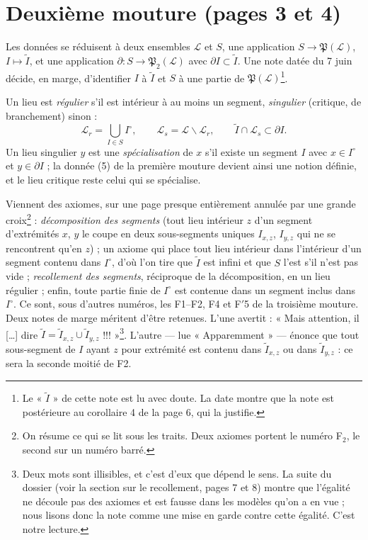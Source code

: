 \documentclass[11pt,a4paper]{article}
\begin{document}
\section*{Deuxième mouture (pages 3 et 4)}

Les données se réduisent à deux ensembles $\mathcal{L}$ et $S$, une
application $S \to \mathfrak{P}(\mathcal{L})$, $I \mapsto \widetilde{I}$, et
une application $\partial : S \to \mathfrak{P}_{2}(\mathcal{L})$ avec
$\partial I \subset \widetilde{I}$. Une note datée du 7 juin décide, en
marge, d'identifier $I$ à $\widetilde{I}$ et $S$ à une partie de
$\mathfrak{P}(\mathcal{L})$\footnote{Le « $\widetilde{I}$ » de cette note est
lu avec doute. La date montre que la note est postérieure au corollaire 4 de
la page 6, qui la justifie.}.

Un lieu est \emph{régulier} s'il est intérieur à au moins un segment,
\emph{singulier} (critique, de branchement) sinon :
\[
\mathcal{L}_{r} = \bigcup_{I \in S} I^{\circ}, \qquad \mathcal{L}_{s} =
\mathcal{L} \smallsetminus \mathcal{L}_{r}, \qquad \widetilde{I} \cap
\mathcal{L}_{s} \subset \partial I .
\]
Un lieu singulier $y$ est une \emph{spécialisation} de $x$ s'il existe un
segment $I$ avec $x \in I^{\circ}$ et $y \in \partial I$ ; la donnée (5) de la
première mouture devient ainsi une notion définie, et le lieu critique reste
celui qui se spécialise.

Viennent des axiomes, sur une page presque entièrement annulée par une
grande croix\footnote{On résume ce qui se lit sous les traits. Deux axiomes
portent le numéro F$_{2}$, le second sur un numéro barré.} :
\emph{décomposition des segments} (tout lieu intérieur $z$ d'un segment
d'extrémités $x$, $y$ le coupe en deux sous-segments uniques $I_{x,z}$,
$I_{y,z}$ qui ne se rencontrent qu'en $z$) ; un axiome qui place tout lieu
intérieur dans l'intérieur d'un segment contenu dans $I^{\circ}$, d'où l'on
tire que $\widetilde{I}$ est infini et que $S$ l'est s'il n'est pas vide ;
\emph{recollement des segments}, réciproque de la décomposition, en un lieu
régulier ; enfin, toute partie finie de $I^{\circ}$ est contenue dans un
segment inclus dans $I^{\circ}$. Ce sont, sous d'autres numéros, les F1--F2,
F4 et F$'$5 de la troisième mouture. Deux notes de marge méritent d'être
retenues. L'une avertit : « Mais attention, il [\dots] dire $\widetilde{I} =
\widetilde{I}_{x,z} \cup \widetilde{I}_{y,z}$ !!! »\footnote{Deux mots sont
illisibles, et c'est d'eux que dépend le sens. La suite du dossier (voir la
section sur le recollement, pages 7 et 8) montre que l'égalité ne découle pas
des axiomes et est fausse dans les modèles qu'on a en vue ; nous lisons donc
la note comme une mise en garde contre cette égalité. C'est notre lecture.}.
L'autre --- lue « Apparemment » --- énonce que tout sous-segment de $I$ ayant
$z$ pour extrémité est contenu dans $\widetilde{I}_{x,z}$ ou dans
$\widetilde{I}_{y,z}$ : ce sera la seconde moitié de F2.
\end{document}
